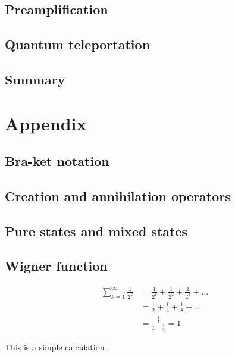 \documentclass{book}
\begin{document}
\section{Preamplification}
\section{Quantum teleportation}
\section{Summary}

\appendix
\chapter{Appendix}
\section{Bra-ket notation}
\section{Creation and annihilation operators}
\section{Pure states and mixed states}
\section{Wigner function}

\begin{equation}
\begin{aligned}
  \sum_{k=1}^\infty \frac 1 {2^k} &= \frac 1 {2^1} + \frac 1 {2^2} + \frac 1 {2^3} + \dots \\
  &= \frac{1}{2} + \frac{1}{4} + \frac{1}{8} + \dots \\
  &= \frac{\frac 1 2}{1-\frac 1 2} =  1
\end{aligned}
\end{equation}

This is a simple calculation \cite{adams1995hitchhiker}.

\printindex



\end{document}
